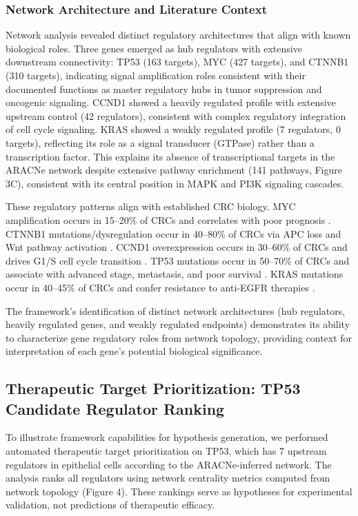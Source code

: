 \documentclass[11pt]{article}
\begin{document}
\subsubsection{Network Architecture and Literature Context}

Network analysis revealed distinct regulatory architectures that align with known biological roles. Three genes emerged as hub regulators with extensive downstream connectivity: TP53 (163 targets), MYC (427 targets), and CTNNB1 (310 targets), indicating signal amplification roles consistent with their documented functions as master regulatory hubs in tumor suppression and oncogenic signaling. CCND1 showed a heavily regulated profile with extensive upstream control (42 regulators), consistent with complex regulatory integration of cell cycle signaling. KRAS showed a weakly regulated profile (7 regulators, 0 targets), reflecting its role as a signal transducer (GTPase) rather than a transcription factor. This explains its absence of transcriptional targets in the ARACNe network despite extensive pathway enrichment (141 pathways, Figure 3C), consistent with its central position in MAPK and PI3K signaling cascades.

These regulatory patterns align with established CRC biology. MYC amplification occurs in 15--20\% of CRCs and correlates with poor prognosis \cite{myc1985,myc2000}. CTNNB1 mutations/dysregulation occur in 40--80\% of CRCs via APC loss and Wnt pathway activation \cite{ctnnb11997,ctnnb12006}. CCND1 overexpression occurs in 30--60\% of CRCs and drives G1/S cell cycle transition \cite{ccnd11995}. TP53 mutations occur in 50--70\% of CRCs and associate with advanced stage, metastasis, and poor survival \cite{tp53_2003,tp53_2010}. KRAS mutations occur in 40--45\% of CRCs and confer resistance to anti-EGFR therapies \cite{kras2006,kras2008}.

The framework's identification of distinct network architectures (hub regulators, heavily regulated genes, and weakly regulated endpoints) demonstrates its ability to characterize gene regulatory roles from network topology, providing context for interpretation of each gene's potential biological significance.

\subsection{Therapeutic Target Prioritization: TP53 Candidate Regulator Ranking}

To illustrate framework capabilities for hypothesis generation, we performed automated therapeutic target prioritization on TP53, which has 7 upstream regulators in epithelial cells according to the ARACNe-inferred network. The analysis ranks all regulators using network centrality metrics computed from network topology (Figure 4). These rankings serve as hypotheses for experimental validation, not predictions of therapeutic efficacy.
\end{document}

